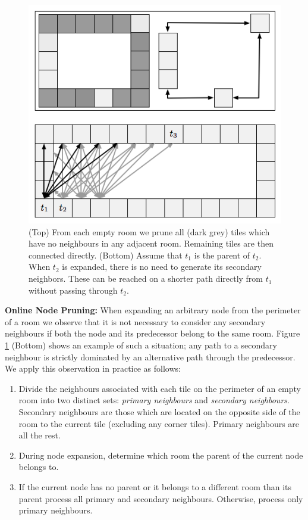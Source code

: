 \begin{figure}[t]
	\begin{center}
	\includegraphics[scale=0.5, trim = 10mm 10mm 10mm 0mm]
	{diagrams/branching.png}
	\end{center}
	\vspace{-3pt}
	\caption{(Top) From each empty room we prune all (dark grey) tiles which
	have no neighbours in any adjacent room.
	Remaining tiles are then connected directly.
	(Bottom) Assume that $t_{1}$ is the parent of $t_2$. When $t_2$
	is expanded, there is no need to generate its secondary neighbors.
	These can be reached on a shorter path directly from $t_1$ without
	passing through $t_2$.
}
\label{fig-branching}
\end{figure}

\par \noindent \newline
\textbf{Online Node Pruning:} 
When expanding an arbitrary node from the perimeter of a room we observe that
it is not necessary to consider any secondary neighbours if both the node
and its predecessor belong to the same room. Figure \ref{fig-branching} (Bottom) shows an 
example of such a situation; any path to a secondary neighbour is strictly
dominated by an alternative path through the predecessor.
We apply this observation in practice as follows:
\begin{enumerate}
\item{Divide the neighbours associated with each tile on the perimeter of an empty room into two distinct sets:
\emph{primary neighbours} and \emph{secondary neighbours}.
Secondary neighbours are those which are located on the opposite side of the
room to the current tile  (excluding any corner tiles).
Primary neighbours are all the rest.}
\item{During node expansion, determine which room the parent of the current node belongs to.}
\item{If the current node has no parent or it belongs to a different room than
its parent process all primary and secondary neighbours. Otherwise, process only primary neighbours.}
\end{enumerate}

